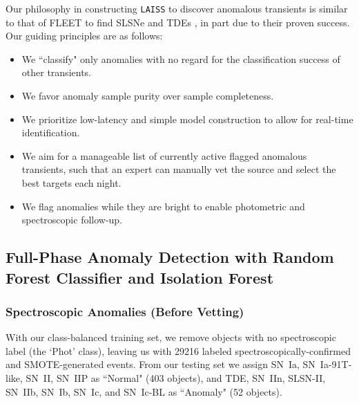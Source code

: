 \documentclass[twocolumn]{aastex63}
\newcommand{\laiss}{\texttt{LAISS}}
\begin{document}
Our philosophy in constructing \laiss{} to discover anomalous transients is similar to that of FLEET \citep{Gomez2020} to find SLSNe \citep{Gomez2023SLSN} and TDEs \citep{Gomez2023TDE}, in part due to their proven success. Our guiding principles are as follows: \par
\begin{itemize}
    \item We ``classify" only anomalies with no regard for the classification success of other transients.
    \item We favor anomaly sample purity over sample completeness.
    \item We prioritize low-latency and simple model construction to allow for real-time identification.
    \item We aim for a manageable list of currently active flagged anomalous transients, such that an expert can manually vet the source and select the best targets each night.
    \item We flag anomalies while they are bright to enable photometric and spectroscopic follow-up.
\end{itemize}

\subsection{Full-Phase Anomaly Detection with Random Forest Classifier and Isolation Forest} \label{subsec:AD_RFC}

\subsubsection{Spectroscopic Anomalies (Before Vetting)} \label{subsubsec:spec_anom_only}

With our class-balanced training set, we remove objects with no spectroscopic label (the `Phot' class), leaving us with 29216 labeled spectroscopically-confirmed and SMOTE-generated events. From our testing set we assign SN~Ia, SN~Ia-91T-like, SN~II, SN~IIP as ``Normal" (403 objects), and TDE, SN~IIn, SLSN-II, SN~IIb, SN~Ib, SN~Ic, and SN~Ic-BL as ``Anomaly" (52 objects). \par
\end{document}
